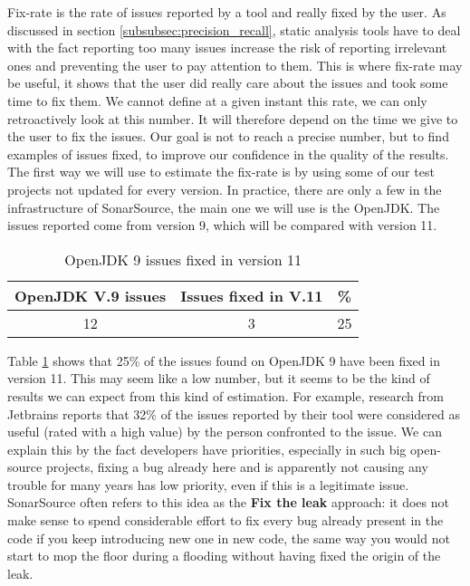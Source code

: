 Fix-rate is the rate of issues reported by a tool and really fixed by the user. 
As discussed in section \ref{subsubsec:precision_recall}, static analysis tools have to deal with the fact reporting too many issues increase the risk of reporting irrelevant ones and preventing the user to pay attention to them.
This is where fix-rate may be useful, it shows that the user did really care about the issues and took some time to fix them. \newline
We cannot define at a given instant this rate, we can only retroactively look at this number.
It will therefore depend on the time we give to the user to fix the issues.
Our goal is not to reach a precise number, but to find examples of issues fixed, to improve our confidence in the quality of the results.\newline
The first way we will use to estimate the fix-rate is by using some of our test projects not updated for every version.
In practice, there are only a few in the infrastructure of SonarSource, the main one we will use is the OpenJDK.
The issues reported come from version 9, which will be compared with version 11.

\begin{table}[h]
	\centering
	\caption{OpenJDK 9 issues fixed in version 11}
	\label{table:openJDK_issues}
	\begin{tabular}{|c|c|c|}
		\hline
		\bf OpenJDK V.9  issues & \bf Issues fixed in V.11 & \bf \% \\ \hline
		12 &  3 &  25 \\ \hline
	\end{tabular}
\end{table}

Table \ref{table:openJDK_issues} shows that 25\% of the issues found on OpenJDK 9 have been fixed in version 11. 
This may seem like a low number, but it seems to be the kind of results we can expect from this kind of estimation.
For example, research from Jetbrains \cite{Bryksin:2018:DAK:3236454.3236457} reports that 32\% of the issues reported by their tool were considered as useful (rated with a high value) by the person confronted to the issue. 
We can explain this by the fact developers have priorities, especially in such big open-source projects, fixing a bug already here and is apparently not causing any trouble for many years has low priority, even if this is a legitimate issue. 
SonarSource often refers to this idea as the \textbf{Fix the leak} approach: it does not make sense to spend considerable effort to fix every bug already present in the code if you keep introducing new one in new code, the same way you would not start to mop the floor during a flooding without having fixed the origin of the leak.


